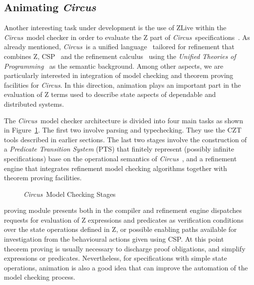 \documentclass{llncs}
\newcommand{\Circus}{{\sf\slshape Circus}}
\begin{document}
\subsection{Animating \Circus}

    Another interesting task under development is the use of ZLive
    within the \Circus\ model checker in order to evaluate the Z part
    of \Circus\ specifications~\cite{circus.mc:leo}.  As already
    mentioned, \Circus\ is a unified language~\cite{circus.sem:intro}
    tailored for refinement that combines Z,
    CSP~\cite{csp.books:roscoe} and the refinement
    calculus~\cite{fm.ref:morgan} using the \textit{Unified Theories
    of Programming}~\cite{hoare.utp} as the semantic background.
    Among other aspects, we are particularly interested in integration
    of model checking and theorem proving facilities for \Circus. In
    this direction, animation plays an important part in the
    evaluation of Z terms used to describe state aspects of dependable
    and distributed systems.

    The \Circus\ model checker architecture is divided into four main
    tasks as shown in Figure~\ref{mc-stages}.  The first two involve
    parsing and typechecking. They use the CZT tools described in
    earlier sections. The last two stages involve the construction of
    a \textit{Predicate Transition System} (PTS) that finitely
    represent (possibly infinite specifications) base on the
    operational semantics of \Circus~\cite{circus.mc:opsem}, and a
    refinement engine that integrates refinement model checking
    algorithms together with theorem proving facilities.  %
    \begin{figure}[t] \begin{center}  \end{center} \caption{\Circus\ Model
    Checking Stages}\label{mc-stages} \end{figure} %
    proving module presents both in the compiler and refinement engine
    dispatches requests for evaluation of Z expressions and predicates
    as verification conditions over the state operations defined in Z,
    or possible enabling paths available for investigation from the
    behavioural actions given using CSP.  At this point theorem
    proving is usually necessary to discharge proof obligations, and
    simplify expressions or predicates. Nevertheless, for
    specifications with simple state operations, animation is also a
    good idea that can improve the automation of the model checking
    process.
\end{document}
